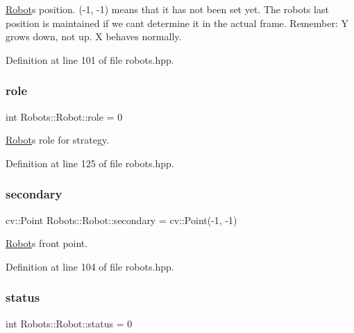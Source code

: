 \hyperlink{struct_robots_1_1_robot}{Robot}\textquotesingle{}s position. (-\/1, -\/1) means that it has not been set yet. The robot\textquotesingle{}s last position is maintained if we can\textquotesingle{}t determine it in the actual frame. Remember\+: Y grows down, not up. X behaves normally. 

Definition at line 101 of file robots.\+hpp.

\mbox{\label{struct_robots_1_1_robot_a8a6fa150b5dead69ab5a94ec92046f71}} 
\subsubsection{\texorpdfstring{role}{role}}
{\footnotesize\ttfamily int Robots\+::\+Robot\+::role = 0}



\hyperlink{struct_robots_1_1_robot}{Robot}\textquotesingle{}s role for strategy. 



Definition at line 125 of file robots.\+hpp.

\mbox{\label{struct_robots_1_1_robot_aa704ae0b73b952e80f990c529abf1f9c}} 
\subsubsection{\texorpdfstring{secondary}{secondary}}
{\footnotesize\ttfamily cv\+::\+Point Robots\+::\+Robot\+::secondary = cv\+::\+Point(-\/1, -\/1)}



\hyperlink{struct_robots_1_1_robot}{Robot}\textquotesingle{}s front point. 



Definition at line 104 of file robots.\+hpp.

\mbox{\label{struct_robots_1_1_robot_ad161e93e13655a26146a5b5cd3d8f34b}} 
\subsubsection{\texorpdfstring{status}{status}}
{\footnotesize\ttfamily int Robots\+::\+Robot\+::status = 0}



